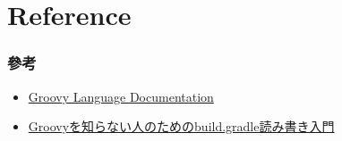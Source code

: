 \documentclass{beamer}
\begin{document}

\fi
\section{Reference}
\begin{frame}
    \frametitle{參考}
    \begin{itemize}
        \item \href{https://docs.groovy-lang.org/docs/next/html/documentation/}{Groovy Language Documentation}
        \item \href{https://qiita.com/opengl-8080/items/a0bb31fb20cb6505188b}{Groovyを知らない人のためのbuild.gradle読み書き入門}
    \end{itemize}
\end{frame}
\ifx\allfiles\undefined
\end{document}
